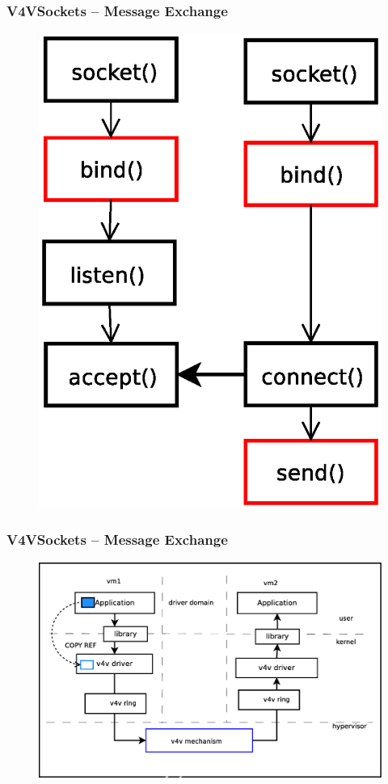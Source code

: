 \documentclass[red,slidestop,notes,compress,mathserif]{beamer}
\begin{document}
\begin{frame}
\frametitle{V4VSockets -- Message Exchange}
\begin{figure}
\includegraphics[scale=0.30]{figures/sockets3.eps}
\end{figure}
\end{frame}

\begin{frame}
\frametitle{V4VSockets -- Message Exchange}
\begin{figure}
\includegraphics[scale=0.30]{figures/v4vsockets4.eps}
\end{figure}
\end{frame}
\end{document}
